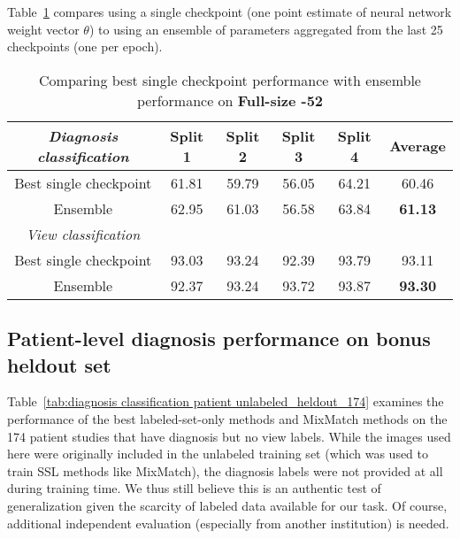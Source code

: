 Table~\ref{tab:best_single_checkpoint_VS_ensemble_FS_echo260} compares using a single checkpoint (one point estimate of neural network weight vector $\theta$) to using an ensemble of parameters aggregated from the last 25 checkpoints (one per epoch).

\begin{table}[!h]
    \centering
    \begin{tabular}{c|cccc|c}
    \textit{Diagnosis classification} & Split 1  & Split 2 & Split 3 & Split 4 & Average\\
    \hline
    Best single checkpoint  & 61.81 & 59.79 & 56.05 & 64.21 & 60.46\\
    Ensemble  & 62.95 & 61.03 & 56.58 & 63.84 & \textbf{61.13}
	\\ \hline
    \textit{View classification}  &   &  &  &  & 
    \\ \hline
    Best single checkpoint  & 93.03 & 93.24 & 92.39 & 93.79 & 93.11\\
    Ensemble  & 92.37 & 93.24 & 93.72 & 93.87 & \textbf{93.30}\\
    \end{tabular}
    \caption{Comparing best single checkpoint performance with ensemble performance on \textbf{Full-size -52}}
    \label{tab:best_single_checkpoint_VS_ensemble_FS_echo260}
\end{table}


\subsection{Patient-level diagnosis performance on bonus heldout set}

Table~\ref{tab:diagnosis classification patient unlabeled_heldout_174} examines the performance of the best labeled-set-only methods and MixMatch methods on the 174 patient studies that have diagnosis but no view labels.
 While the images used here were originally included in the unlabeled training set (which was used to train SSL methods like MixMatch), the diagnosis labels were not provided at all during training time. 
 We thus still believe this is an authentic test of generalization given the scarcity of labeled data available for our task.
 Of course, additional independent evaluation (especially from another institution) is needed.


